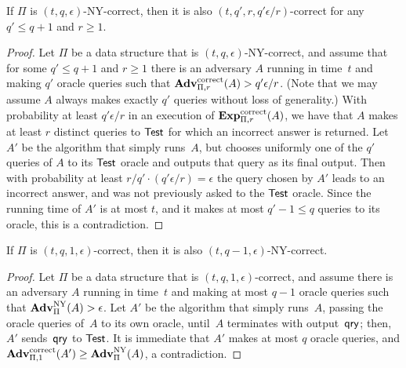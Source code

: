 \begin{theorem}
If $\Pi$ is $(t,q,\epsilon)$-NY-correct, then it is also
$(t, q', r, q'\epsilon/r)$-correct for any $q' \leq q+1$ and $r\geq
1$.
\end{theorem}
\begin{proof}
Let $\Pi$ be a data structure that is $(t,q,\epsilon)$-NY-correct,
and assume that for some $q' \leq q+1$ and
$r \geq 1$
there is an adversary $A$ running in time~$t$
and making $q'$ oracle queries such that
$\mathrm{\mathbf{Adv}}^{\mathrm{correct}}_{\Pi,r}(A) > q'\epsilon/r$.
(Note that
we may assume $A$ always makes exactly $q'$ queries without loss of generality.)
With probability at least
$q'\epsilon/r$ in an execution of $\mathrm{\mathbf{Exp}}^{\mathrm{correct}}_{\Pi,r}(A)$, we have that
$A$ makes at least $r$ distinct queries to $\mathsf{Test}$ for which
an incorrect answer is returned. Let $A'$ be the algorithm that simply
runs~$A$, but chooses
uniformly one of the $q'$ queries of $A$ to its $\mathsf{Test}$ oracle and outputs that query
as its final output. Then with probability at least $r/q' \cdot (q'\epsilon/r)=\epsilon$
the query chosen by $A'$
leads to an incorrect answer, and was not previously asked to the $\mathsf{Test}$ oracle.
Since the running time of $A'$ is at most $t$, and it makes at most $q'-1 \leq q$ queries
to its oracle, this is a contradiction.
\end{proof}


\begin{theorem}
If $\Pi$ is $(t, q, 1, \epsilon)$-correct, then it is also $(t, q-1, \epsilon)$-NY-correct.
\end{theorem}

\begin{proof}
Let $\Pi$ be a data structure that is $(t,q,1,\epsilon)$-correct,
and assume
there is an adversary $A$ running in time~$t$
and making at most $q-1$ oracle queries such that
$\mathrm{\mathbf{Adv}}^{\mathrm{NY}}_{\Pi}(A) > \epsilon$.
Let $A'$ be the algorithm that simply
runs~$A$, passing the oracle queries of~$A$ to its own oracle, until~$A$ terminates
with output~$\mathsf{qry}$; then, $A'$ sends~$\mathsf{qry}$ to $\mathsf{Test}$. It is immediate that $A'$ makes at most $q$ oracle queries, and
$\mathrm{\mathbf{Adv}}^{\mathrm{correct}}_{\Pi,1}(A') \geq \mathrm{\mathbf{Adv}}^{\mathrm{NY}}_{\Pi}(A)$, a contradiction.
\end{proof}

